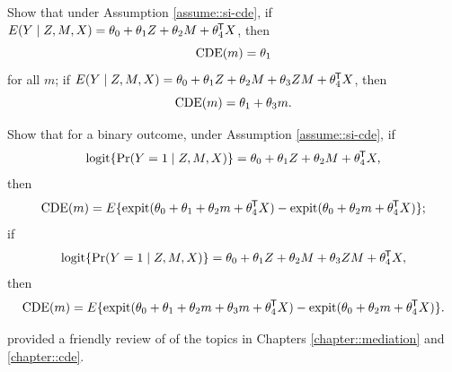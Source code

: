 \begin{HomeworkProblem}\label{exr:28-3}

  Show that under Assumption \ref{assume::si-cde}, if $E(Y\mid Z, M, X ) = \theta_0 + \theta_1 Z + \theta_2 M +   \theta_4^{\mkern-1.5mu\mathsf{T}} X$, then
  \[
  \mathrm{CDE} (m) = \theta_1
  \]
  for all $m$;
  if $E(Y\mid Z, M, X ) = \theta_0 + \theta_1 Z + \theta_2 M + \theta_3 ZM +    \theta_4^{\mkern-1.5mu\mathsf{T}} X$, then
  \[
\mathrm{CDE}(m) =   \theta_1 + \theta_3 m.
  \]


\end{HomeworkProblem}

\begin{HomeworkProblem}\label{exr:28-4}

  Show that for a binary outcome, under Assumption \ref{assume::si-cde}, if
  \[
  \textup{logit} \{ \operatorname{Pr}(Y = 1\mid Z, M, X ) \} = \theta_0 + \theta_1 Z + \theta_2 M +   \theta_4^{\mkern-1.5mu\mathsf{T}} X ,
  \]
  then
  \[
  \mathrm{CDE} (m) = E\{ \textup{expit}( \theta_0 + \theta_1  + \theta_2 m +   \theta_4^{\mkern-1.5mu\mathsf{T}} X ) - \textup{expit}( \theta_0    + \theta_2 m +   \theta_4^{\mkern-1.5mu\mathsf{T}} X ) \} ;
  \]
  if
  \[
  \textup{logit} \{ \operatorname{Pr}(Y = 1\mid Z, M, X ) \} = \theta_0 + \theta_1 Z + \theta_2 M + \theta_3 ZM +    \theta_4^{\mkern-1.5mu\mathsf{T}} X,
  \]
  then
  \[
\mathrm{CDE}(m) =  E\{ \textup{expit}( \theta_0 + \theta_1  + \theta_2 m  +\theta_3 m +   \theta_4^{\mkern-1.5mu\mathsf{T}} X ) - \textup{expit}( \theta_0    + \theta_2 m +   \theta_4^{\mkern-1.5mu\mathsf{T}} X ) \}.
  \]



\end{HomeworkProblem}

\begin{HomeworkProblem}\label{exr:28-5}

\citet{nguyen2020clarifying} provided a friendly review of of the topics in Chapters \ref{chapter::mediation} and \ref{chapter::cde}.


\end{HomeworkProblem}
